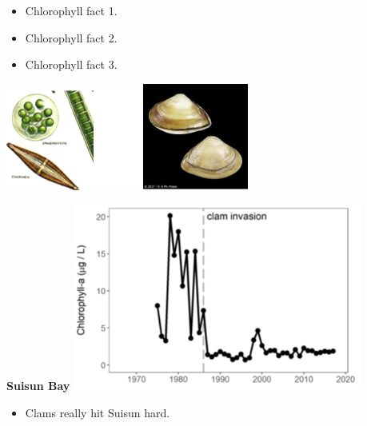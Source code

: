\documentclass[]{article}\usepackage[]{graphicx}\usepackage[]{color}
\begin{document}
\vspace{1cm}

\begin{Row}
  \begin{Cell}{7}
    \begin{center}
      \begin{itemize}[leftmargin=1cm,rightmargin=1cm]
        \item Chlorophyll fact 1.
        \item Chlorophyll fact 2.
        \item Chlorophyll fact 3.
      \end{itemize}
      \vspace{0.5cm}
      \includegraphics[width=8cm,align=m]{figures/chlorophyll/chlorophyll_pics.png}
    \end{center}
  \end{Cell}
  \begin{Cell}{6}
    \begin{center}
      {\bf {\large Suisun Bay}}
      \includegraphics[width=9.5cm,align=m]{figures/chlorophyll/chlorophyll_suisun_bay_tmp.png}
      \vspace{0.5cm}
      \begin{itemize}[leftmargin=2cm,rightmargin=0.5cm]
        \item Clams really hit Suisun hard.
      \end{itemize}
    \end{center}
  \end{Cell}
\end{Row}
\end{document}
